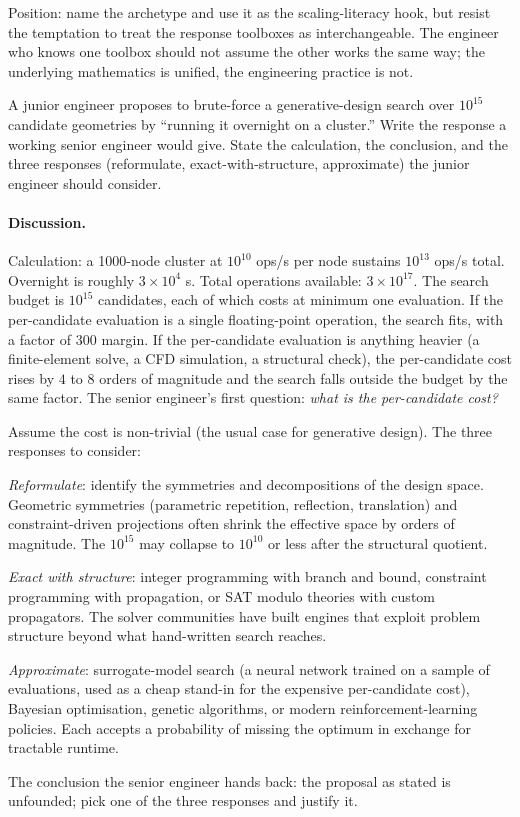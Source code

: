 Position: name the archetype and use it as the scaling-literacy
hook, but resist the temptation to treat the response toolboxes as
interchangeable. The engineer who knows one toolbox should not
assume the other works the same way; the underlying mathematics is
unified, the engineering practice is not.

\begin{exercise}
A junior engineer proposes to brute-force a generative-design
search over $10^{15}$ candidate geometries by ``running it
overnight on a cluster.'' Write the response a working senior
engineer would give. State the calculation, the conclusion, and
the three responses (reformulate, exact-with-structure, approximate)
the junior engineer should consider.
\end{exercise}

\paragraph{Discussion.}
Calculation: a 1000-node cluster at $10^{10}$ ops/s per node
sustains $10^{13}$ ops/s total. Overnight is roughly $3 \times
10^{4}$ s. Total operations available: $3 \times 10^{17}$. The
search budget is $10^{15}$ candidates, each of which costs at
minimum one evaluation. If the per-candidate evaluation is a
single floating-point operation, the search fits, with a factor
of $300$ margin. If the per-candidate evaluation is anything
heavier (a finite-element solve, a CFD simulation, a structural
check), the per-candidate cost rises by $4$ to $8$ orders of
magnitude and the search falls outside the budget by the same
factor. The senior engineer's first question: \textit{what is the
per-candidate cost?}

Assume the cost is non-trivial (the usual case for generative
design). The three responses to consider:

\textit{Reformulate}: identify the symmetries and decompositions
of the design space. Geometric symmetries (parametric repetition,
reflection, translation) and constraint-driven projections often
shrink the effective space by orders of magnitude. The
$10^{15}$ may collapse to $10^{10}$ or less after the structural
quotient.

\textit{Exact with structure}: integer programming with branch and
bound, constraint programming with propagation, or SAT modulo
theories with custom propagators. The solver communities have
built engines that exploit problem structure beyond what hand-written
search reaches.

\textit{Approximate}: surrogate-model search (a neural network
trained on a sample of evaluations, used as a cheap stand-in for
the expensive per-candidate cost), Bayesian optimisation, genetic
algorithms, or modern reinforcement-learning policies. Each
accepts a probability of missing the optimum in exchange for
tractable runtime.

The conclusion the senior engineer hands back: the proposal as
stated is unfounded; pick one of the three responses and justify
it.

